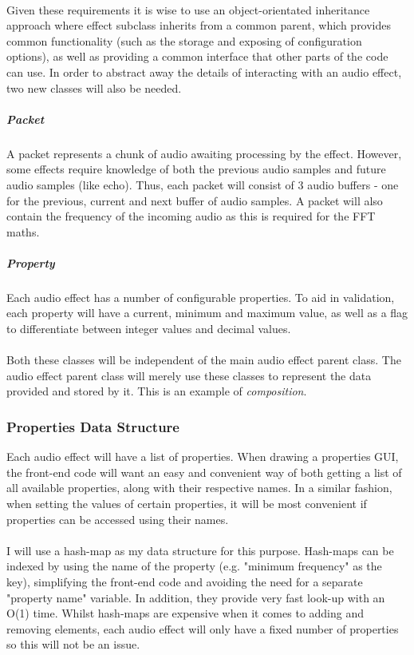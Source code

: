 \paragraph{}
Given these requirements it is wise to use an object-orientated inheritance approach where effect subclass inherits from a common parent, which provides common functionality (such as the storage and exposing of configuration options), as well as providing a common interface that other parts of the code can use. In order to abstract away the details of interacting with an audio effect, two new classes will also be needed.

\subparagraph{Packet} A packet represents a chunk of audio awaiting processing by the effect. However, some effects require knowledge of both the previous audio samples and future audio samples (like echo). Thus, each packet will consist of 3 audio buffers - one for the previous, current and next buffer of audio samples. A packet will also contain the frequency of the incoming audio as this is required for the FFT maths.

\subparagraph{Property} Each audio effect has a number of configurable properties. To aid in validation, each property will have a current,  minimum and maximum value, as well as a flag to differentiate between integer values and decimal values.

\paragraph{}
Both these classes will be independent of the main audio effect parent class. The audio effect parent class will merely use these classes to represent the data provided and stored by it. This is an example of {\it composition}.

\subsubsection{Properties Data Structure}
Each audio effect will have a list of properties. When drawing a properties GUI, the front-end code will want an easy and convenient way of both getting a list of all available properties, along with their respective names. In a similar fashion, when setting the values of certain properties, it will be most convenient if properties can be accessed using their names.

\paragraph{}
I will use a hash-map as my data structure for this purpose. Hash-maps can be indexed by using the name of the property (e.g. "minimum frequency" as the key), simplifying the front-end code and avoiding the need for a separate "property name" variable. In addition, they provide very fast look-up with an O(1) time. Whilst hash-maps are expensive when it comes to adding and removing elements, each audio effect will only have a fixed number of properties so this will not be an issue.

